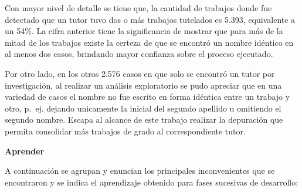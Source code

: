 \documentclass[
  12pt,
  openany]{book}
\begin{document}
Con mayor nivel de detalle se tiene que, la cantidad de trabajos donde fue detectado que un tutor tuvo dos o más trabajos tutelados es 5.393, equivalente a un 54\%. La cifra anterior tiene la significancia de mostrar que para más de la mitad de los trabajos existe la certeza de que se encontró un nombre idéntico en al menos dos casos, brindando mayor confianza sobre el proceso ejecutado.

Por otro lado, en los otros 2.576 casos en que solo se encontró un tutor por investigación, al realizar un análisis exploratorio se pudo apreciar que en una variedad de casos el nombre no fue escrito en forma idéntica entre un trabajo y otro, p.~ej. dejando unicamente la inicial del segundo apellido u omitiendo el segundo nombre. Escapa al alcance de este trabajo realizar la depuración que permita consolidar más trabajos de grado al correspondiente tutor.

\textbf{Aprender}

A continuación se agrupan y enuncian los principales inconvenientes que se encontraron y se indica el aprendizaje obtenido para fases sucesivas de desarrollo:
\end{document}
